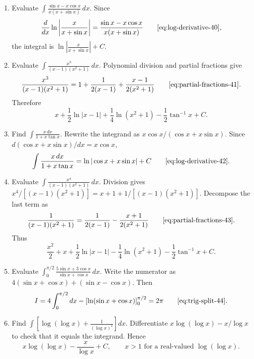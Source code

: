 \begin{enumerate}[leftmargin=4mm,itemsep=9pt]
\[\[\[\[\item Evaluate $\displaystyle\int_0^{\pi/4}\frac{\sin x+\cos x}{3+\sin2x}\,dx$.
\solution Set $u=\sin x-\cos x$, so $du=(\sin x+\cos x)dx$ and $\sin2x=1-u^2$. The limits become $u=-1$ and $u=0$. Hence
\[
I=\int_{-1}^{0}\frac{du}{4-u^2}=\left[\frac14\ln\left|\frac{2+u}{2-u}\right|\right]_{-1}^{0}=\frac14\ln3\qquad\eqref{eq:int-rational-39}.
\]

\item Evaluate $\displaystyle\int\frac{\sin x-x\cos x}{x(x+\sin x)}\,dx$.
\solution Since
\[
\frac{d}{dx}\ln\left|\frac{x}{x+\sin x}\right|=\frac{\sin x-x\cos x}{x(x+\sin x)}\qquad\eqref{eq:log-derivative-40},
\]
the integral is $\ln\left|\frac{x}{x+\sin x}\right|+C$.

\item Evaluate $\displaystyle\int\frac{x^3}{(x-1)(x^2+1)}\,dx$.
\solution Polynomial division and partial fractions give
\[
\frac{x^3}{(x-1)(x^2+1)}=1+\frac1{2(x-1)}+\frac{x-1}{2(x^2+1)}\qquad\eqref{eq:partial-fractions-41}.
\]
Therefore
\[
x+\frac12\ln|x-1|+\frac14\ln(x^2+1)-\frac12\tan^{-1}x+C.
\]

\item Find $\displaystyle\int\frac{x\,dx}{1+x\tan x}$.
\solution Rewrite the integrand as $x\cos x/(\cos x+x\sin x)$. Since $d(\cos x+x\sin x)/dx=x\cos x$,
\[
\int\frac{x\,dx}{1+x\tan x}=\ln|\cos x+x\sin x|+C\qquad\eqref{eq:log-derivative-42}.
\]

\item Evaluate $\displaystyle\int\frac{x^4}{(x-1)(x^2+1)}\,dx$.
\solution Division gives $x^4/[(x-1)(x^2+1)]=x+1+1/[(x-1)(x^2+1)]$. Decompose the last term as
\[
\frac1{(x-1)(x^2+1)}=\frac1{2(x-1)}-\frac{x+1}{2(x^2+1)}\qquad\eqref{eq:partial-fractions-43}.
\]
Thus
\[
\frac{x^2}{2}+x+\frac12\ln|x-1|-\frac14\ln(x^2+1)-\frac12\tan^{-1}x+C.
\]

\item Evaluate $\displaystyle\int_0^{\pi/2}\frac{5\sin x+3\cos x}{\sin x+\cos x}\,dx$.
\solution Write the numerator as $4(\sin x+\cos x)+(\sin x-\cos x)$. Then
\[
I=4\int_0^{\pi/2}dx-\left[\ln(\sin x+\cos x)\right]_0^{\pi/2}=2\pi\qquad\eqref{eq:trig-split-44}.
\]

\item Find $\displaystyle\int\left[\log(\log x)+\frac1{(\log x)^2}\right]dx$.
\solution Differentiate $x\log(\log x)-x/\log x$ to check that it equals the integrand. Hence
\[
x\log(\log x)-\frac{x}{\log x}+C,\qquad x>1\text{ for a real-valued }\log(\log x).
\]

\]\]\]\]
\end{enumerate}
